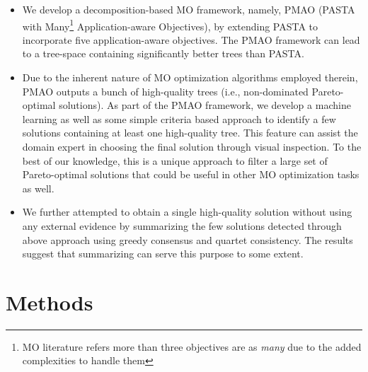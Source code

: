 \documentclass[a4paper,fleqn, review]{cas-dc}
\begin{document}
\begin{itemize}
	\item We develop a decomposition-based MO framework, namely, PMAO (PASTA with Many\footnote{ MO literature refers more than three objectives are as \textit{many}\cite{li2015many} due to the added complexities to handle them} Application-aware Objectives), by extending PASTA to incorporate five application-aware objectives. The PMAO framework can lead to a tree-space containing significantly better trees than PASTA. 
	
	\item Due to the inherent nature of MO optimization algorithms employed therein, PMAO outputs a bunch of high-quality trees (i.e., non-dominated Pareto-optimal solutions). As part of the PMAO framework, we develop a machine learning as well as some simple criteria based approach to identify a few solutions containing at least one high-quality tree. This feature can assist the domain expert in choosing the final solution through visual inspection. To the best of our knowledge, this is a unique approach to filter a large set of Pareto-optimal solutions that could be useful in other MO optimization tasks as well. 
	
	\item We further attempted to obtain a single high-quality solution without using any external evidence by summarizing the few solutions detected through above approach using greedy consensus and quartet consistency. The results suggest that summarizing can serve this purpose to some extent.
	
\end{itemize}


\section{Methods}
\label{sec:method}
\end{document}
